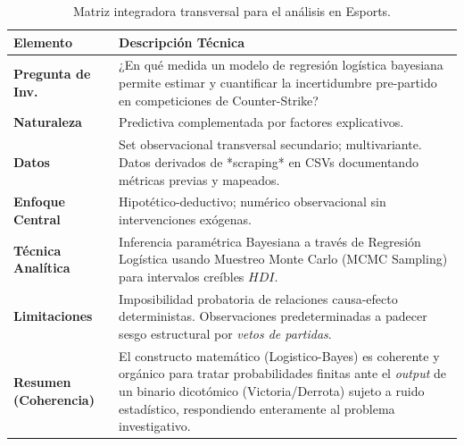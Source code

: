 \documentclass[12pt, a4paper]{article}
\begin{document}
\begin{table}[h!]
\centering
\renewcommand{\arraystretch}{1.5}
\begin{tabularx}{\textwidth}{@{} l X @{}}
\toprule
\textbf{Elemento} & \textbf{Descripción Técnica} \\ 
\midrule
\textbf{Pregunta de Inv.} & ¿En qué medida un modelo de regresión logística bayesiana permite estimar y cuantificar la incertidumbre pre-partido en competiciones de Counter-Strike? \\ 
\textbf{Naturaleza} & Predictiva complementada por factores explicativos. \\ 
\textbf{Datos} & Set observacional transversal secundario; multivariante. Datos derivados de *scraping* en CSVs documentando métricas previas y mapeados. \\ 
\textbf{Enfoque Central} & Hipotético-deductivo; numérico observacional sin intervenciones exógenas. \\ 
\textbf{Técnica Analítica} & Inferencia paramétrica Bayesiana a través de Regresión Logística usando Muestreo Monte Carlo (MCMC Sampling) para intervalos creíbles $HDI$. \\ 
\textbf{Limitaciones} & Imposibilidad probatoria de relaciones causa-efecto deterministas. Observaciones predeterminadas a padecer sesgo estructural por \textit{vetos de partidas}. \\ 
\textbf{Resumen (Coherencia)} & El constructo matemático (Logistico-Bayes) es coherente y orgánico para tratar probabilidades finitas ante el \textit{output} de un binario dicotómico (Victoria/Derrota) sujeto a ruido estadístico, respondiendo enteramente al problema investigativo. \\ 
\bottomrule
\end{tabularx}
\caption{Matriz integradora transversal para el análisis en Esports.}
\end{table}
\end{document}
